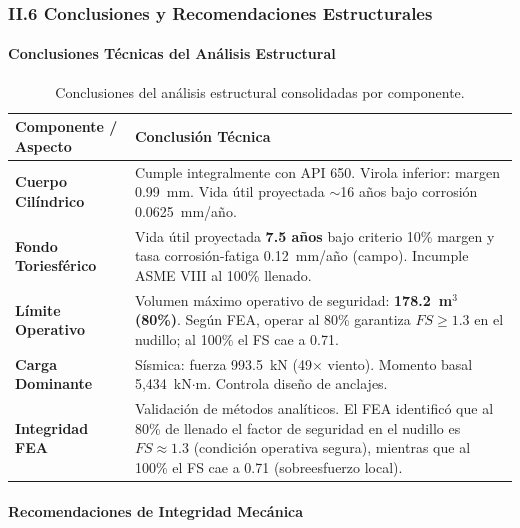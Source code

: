 \subsubsection*{II.6 Conclusiones y Recomendaciones Estructurales}

\paragraph{Conclusiones Técnicas del Análisis Estructural}

\begin{table}[H]
\centering
\caption{Conclusiones del análisis estructural consolidadas por componente.}
\label{tab:resumen_conclusiones_estructurales}
\setcounter{itemcount}{0}
\begin{tabularx}{\textwidth}{@{}lX@{}}
\toprule
\textbf{Componente / Aspecto} & \textbf{Conclusión Técnica} \\
\midrule
\textbf{Cuerpo Cilíndrico} & Cumple integralmente con API 650. Virola inferior: margen 0.99~mm. Vida útil proyectada $\sim$16 años bajo corrosión 0.0625~mm/año. \\
\midrule
\textbf{Fondo Toriesférico} & Vida útil proyectada \textbf{7.5 años} bajo criterio 10\% margen y tasa corrosión-fatiga 0.12~mm/año (campo). Incumple ASME VIII al 100\% llenado. \\
\midrule
\textbf{Límite Operativo} & Volumen máximo operativo de seguridad: \textbf{178.2~m$^3$ (80\%)}. Según FEA, operar al 80\% garantiza $FS \geq 1.3$ en el nudillo; al 100\% el FS cae a 0.71. \\
\midrule
\textbf{Carga Dominante} & Sísmica: fuerza 993.5~kN (49$\times$ viento). Momento basal 5,434~kN$\cdot$m. Controla diseño de anclajes. \\
\midrule
\textbf{Integridad FEA} & Validación de métodos analíticos. El FEA identificó que al 80\% de llenado el factor de seguridad en el nudillo es $FS \approx 1.3$ (condición operativa segura), mientras que al 100\% el FS cae a 0.71 (sobreesfuerzo local). \\
\bottomrule
\end{tabularx}
\end{table}

\paragraph{Recomendaciones de Integridad Mecánica}

